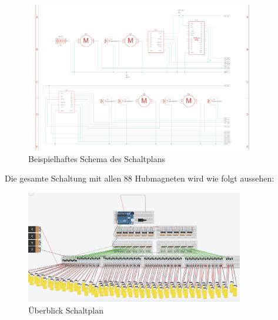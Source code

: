 \begin{figure}[htbp]
	\centering
	\includegraphics[width=0.9\textwidth]{img/SchematischeSchaltungExp}
	\caption{Beispielhaftes Schema des Schaltplans}
	\label{img:SchaltungExpSchema}
\end{figure}

Die gesamte Schaltung mit allen 88 Hubmagneten wird wie folgt aussehen:

\begin{figure}[htbp]
	\centering
	\includegraphics [width=0.85\textwidth] {img/SchaltungGesamt}
	\caption{Überblick Schaltplan}
	\label{img:Schaltplan}
\end{figure}


